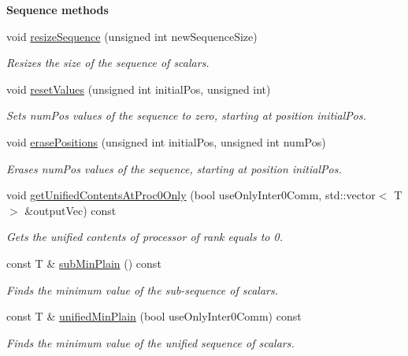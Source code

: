 \begin{Indent}{\bf Sequence methods}
\begin{DoxyCompactItemize}
void \hyperlink{class_q_u_e_s_o_1_1_scalar_sequence_a2aa8d77c39927060227275b12b6d3dd0}{resize\-Sequence} (unsigned int new\-Sequence\-Size)
\begin{DoxyCompactList}\small\item\em Resizes the size of the sequence of scalars. \end{DoxyCompactList}\item 
void \hyperlink{class_q_u_e_s_o_1_1_scalar_sequence_adbddbb64d7fa4853deecb92dfa28b19f}{reset\-Values} (unsigned int initial\-Pos, unsigned int)
\begin{DoxyCompactList}\small\item\em Sets {\ttfamily num\-Pos} values of the sequence to zero, starting at position {\ttfamily initial\-Pos}. \end{DoxyCompactList}\item 
void \hyperlink{class_q_u_e_s_o_1_1_scalar_sequence_a1606584d26bf9f876a4bc4e20839a201}{erase\-Positions} (unsigned int initial\-Pos, unsigned int num\-Pos)
\begin{DoxyCompactList}\small\item\em Erases {\ttfamily num\-Pos} values of the sequence, starting at position {\ttfamily initial\-Pos}. \end{DoxyCompactList}\item 
void \hyperlink{class_q_u_e_s_o_1_1_scalar_sequence_ab8802412461496eb72f6c1267507c28c}{get\-Unified\-Contents\-At\-Proc0\-Only} (bool use\-Only\-Inter0\-Comm, std\-::vector$<$ T $>$ \&output\-Vec) const 
\begin{DoxyCompactList}\small\item\em Gets the unified contents of processor of rank equals to 0. \end{DoxyCompactList}\item 
const T \& \hyperlink{class_q_u_e_s_o_1_1_scalar_sequence_ab0ae335d0a9a17a3f3873eae13deaba2}{sub\-Min\-Plain} () const 
\begin{DoxyCompactList}\small\item\em Finds the minimum value of the sub-\/sequence of scalars. \end{DoxyCompactList}\item 
const T \& \hyperlink{class_q_u_e_s_o_1_1_scalar_sequence_a3a0a65ce7ab1474962e644624ae3631d}{unified\-Min\-Plain} (bool use\-Only\-Inter0\-Comm) const 
\begin{DoxyCompactList}\small\item\em Finds the minimum value of the unified sequence of scalars. \end{DoxyCompactList}\item 

\end{DoxyCompactItemize}
\end{Indent}
